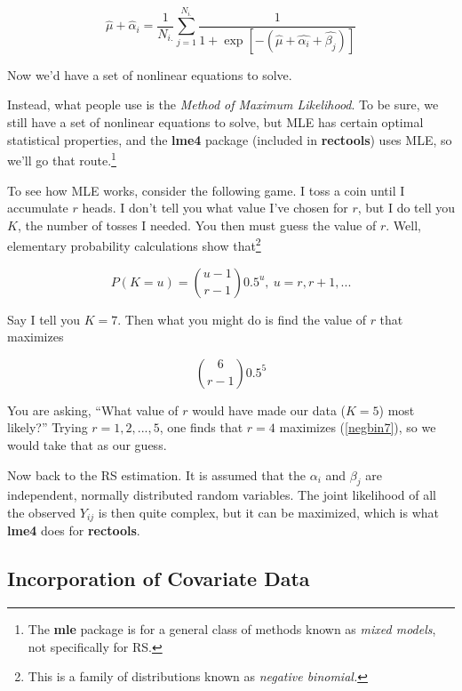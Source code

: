 \begin{equation}
\label{nonlin1}
\widehat{\mu} + \widehat{\alpha}_i = 
\frac{1}{N_{i.}} \sum_{j=1}^{N_{i.}}
\frac{1}{1 + \exp[-(\widehat{\mu} + \widehat{\alpha_i} + \widehat{\beta_j})]}
\end{equation}

Now we'd have a set of nonlinear equations to solve.

Instead, what people use is the \textit{Method of Maximum Likelihood}.
To be sure, we still have a set of nonlinear equations to solve, but MLE
has certain optimal statistical properties, and the \textbf{lme4}
package (included in \textbf{rectools}) uses MLE, so we'll go that
route.\footnote{The \textbf{mle} package is for a general class of
methods known as \textit{mixed models}, not specifically for RS.}

To see how MLE works, consider the following game.  I toss a coin until
I accumulate $r$ heads.  I don't tell you what value I've chosen for
$r$, but I do tell you $K$, the number of tosses I needed.  You then
must guess the value of $r$.  Well, elementary probability calculations 
show that\footnote{This is a family of distributions known as
\textit{negative binomial.}}

\begin{equation}
\label{negbin}
P(K = u) = \binom{u-1}{r-1} 0.5^u,~ u = r, r+1, ...
\end{equation}

Say I tell you $K = 7$.  Then what you might do is find the value of $r$
that maximizes 

\begin{equation}
\label{negbin7}
\binom{6}{r-1} 0.5^5
\end{equation}

You are asking, ``What value of $r$ would have made our data ($K = 5$)
most likely?''  Trying $r = 1,2,...,5$, one finds that $r = 4$ maximizes
(\ref{negbin7}), so we would take that as our guess.

Now back to the RS estimation.  It is assumed that the $\alpha_i$ and
$\beta_j$ are independent, normally distributed random variables.
The joint likelihood of all the observed $Y_{ij}$ is then quite complex,
but it can be maximized, which is what \textbf{lme4} does for
\textbf{rectools}.  

\subsection{Incorporation of Covariate Data}

